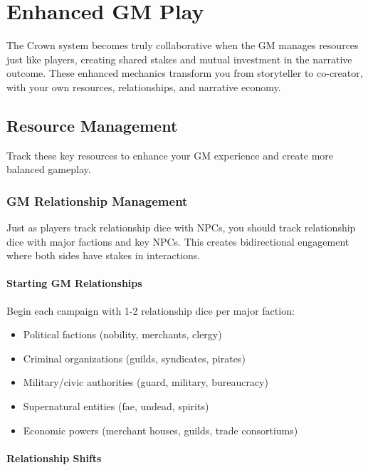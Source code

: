 \chapter{Enhanced GM Play}

The Crown system becomes truly collaborative when the GM manages resources just like players, creating shared stakes and mutual investment in the narrative outcome. These enhanced mechanics transform you from storyteller to co-creator, with your own resources, relationships, and narrative economy.

\section{Resource Management}

Track these key resources to enhance your GM experience and create more balanced gameplay.

\subsection{GM Relationship Management}

Just as players track relationship dice with NPCs, you should track relationship dice with major factions and key NPCs. This creates bidirectional engagement where both sides have stakes in interactions.

\subsubsection{Starting GM Relationships}

Begin each campaign with 1-2 relationship dice per major faction:
\begin{itemize}
\item Political factions (nobility, merchants, clergy)
\item Criminal organizations (guilds, syndicates, pirates)
\item Military/civic authorities (guard, military, bureaucracy)
\item Supernatural entities (fae, undead, spirits)
\item Economic powers (merchant houses, guilds, trade consortiums)
\end{itemize}

\subsubsection{Relationship Shifts}

